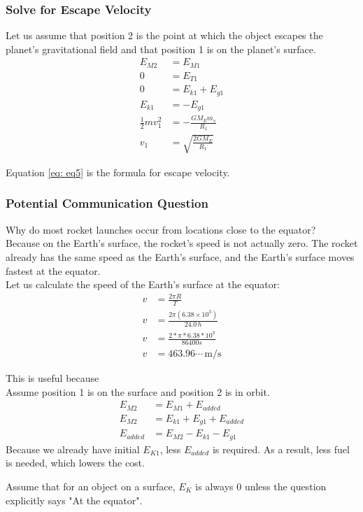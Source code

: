 \subsubsection{Solve for Escape Velocity}
Let us assume that position 2 is the point at which the object escapes the planet's gravitational field and that position 1 is on the planet's surface.
\begin{align}
    E_{M2} &= E_{M1}\\
    0 &= E_{T1}\\
    0 &= E_{k1} + E_{g1}\\
    E_{k1} &= -E_{g1}\\
    \frac{1}{2} m v_1^2 &= -\frac{G M_E m_s}{R_1}\\
    v_1 &= \sqrt{\frac{
        2 G M_E
    }{
        R_1
    }} \label{eq: eq5}
\end{align}

Equation \ref{eq: eq5} is the formula for escape velocity.

\subsubsection{Potential Communication Question}
Why do most rocket launches occur from locations close to the equator?\\

\indent Because on the Earth's surface, the rocket's speed is not actually zero. The rocket already has the same speed as the Earth's surface, and the Earth's surface moves fastest at the equator. \\

Let us calculate the speed of the Earth's surface at the equator:
\begin{align*}
    v &= \frac{2\pi R}{T}\\
    v &= \frac{2\pi (6.38 \times 10^3)}{24.0\,h}\\
    v &= \frac{
        2 * \pi * 6.38 * 10^3
    }{
        86400s
    }\\
    v &= 463.96\cdots\,\text{m/s}
\end{align*}

This is useful because\\
Assume position 1 is on the surface and position 2 is in orbit.
\begin{align*}
    E_{M2} &= E_{M1} + E_{added}\\
    E_{M2} &= E_{k1} + E_{g1} + E_{added}\\
    E_{added} &= E_{M2} - E_{k1} - E_{g1}
\end{align*}
Because we already have initial $E_{K1}$, less $E_{added}$ is required. As a result, less fuel is needed, which lowers the cost.

\begin{remark}
    Assume that for an object on a surface, $E_K$ is always 0 unless the question explicitly says "At the equator".
\end{remark}
